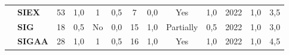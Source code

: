 \begin{table}
\begin{tabular}{c|p{2cm}|cc|cc|cc|cc|cc|c}
    \rowcolor[rgb]{0.898,0.898,0.898} {\cellcolor[rgb]{0.753,0.753,0.753}}          & {\cellcolor[rgb]{0.753,0.753,0.753}}\textbf{SIEX}                                                  & 53                                                                        & 1,0                                                                       & 1                                                                         & 0,5                                                                      & 7                                                        & 0,0                                               & Yes                                                & 1,0                                               & 2022                                               & 1,0                                                                                                                                                 & 3,5 \\
    {\cellcolor[rgb]{0.753,0.753,0.753}}                                            & {\cellcolor[rgb]{0.753,0.753,0.753}}\textbf{SIG}                                                   & 18                                                                        & 0,5                                                                       & No                                                                        & 0,0                                                                      & 15                                                       & 1,0                                               & Partially                                          & 0,5                                               & 2022                                               & 1,0                                                                                                                                                 & 3,0 \\
    \rowcolor[rgb]{0.898,0.898,0.898} {\cellcolor[rgb]{0.753,0.753,0.753}}          & {\cellcolor[rgb]{0.753,0.753,0.753}}\textbf{SIGAA}                                                 & 28                                                                        & 1,0                                                                       & 1                                                                         & 0,5                                                                      & 16                                                       & 1,0                                               & Yes                                                & 1,0                                               & 2022                                               & 1,0                                                                                                                                                 & 4,5 \\

\end{tabular}
\end{table}
